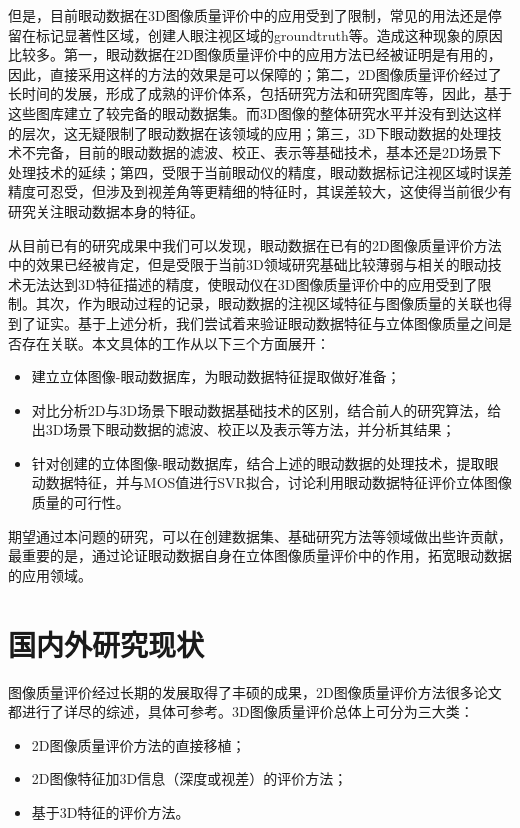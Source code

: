 但是，目前眼动数据在3D图像质量评价中的应用受到了限制，常见的用法还是停留在标记显著性区域，创建人眼注视区域的groundtruth等。造成这种现象的原因比较多。第一，眼动数据在2D图像质量评价中的应用方法已经被证明是有用的\parencite{gidevisual,meining2010eye}，因此，直接采用这样的方法的效果是可以保障的；第二，2D图像质量评价经过了长时间的发展，形成了成熟的评价体系，包括研究方法和研究图库等，因此，基于这些图库建立了较完备的眼动数据集\parencite{winkler2013overview}。而3D图像的整体研究水平并没有到达这样的层次\parencite{bensalma2013perceptual}，这无疑限制了眼动数据在该领域的应用；第三，3D下眼动数据的处理技术不完备，目前的眼动数据的滤波、校正、表示等基础技术，基本还是2D场景下处理技术的延续；第四，受限于当前眼动仪的精度，眼动数据标记注视区域时误差精度可忍受，但涉及到视差角等更精细的特征时，其误差较大，这使得当前很少有研究关注眼动数据本身的特征。

从目前已有的研究成果中我们可以发现，眼动数据在已有的2D图像质量评价方法中的效果已经被肯定，但是受限于当前3D领域研究基础比较薄弱与相关的眼动技术无法达到3D特征描述的精度，使眼动仪在3D图像质量评价中的应用受到了限制。其次，作为眼动过程的记录，眼动数据的注视区域特征与图像质量的关联也得到了证实。基于上述分析，我们尝试着来验证眼动数据特征与立体图像质量之间是否存在关联。本文具体的工作从以下三个方面展开：
\begin{itemize}[noitemsep,topsep=0pt,parsep=0pt,partopsep=0pt]
\item 建立立体图像-眼动数据库，为眼动数据特征提取做好准备；
\item 对比分析2D与3D场景下眼动数据基础技术的区别，结合前人的研究算法，给出3D场景下眼动数据的滤波、校正以及表示等方法，并分析其结果；
\item 针对创建的立体图像-眼动数据库，结合上述的眼动数据的处理技术，提取眼动数据特征，并与MOS值进行SVR拟合，讨论利用眼动数据特征评价立体图像质量的可行性。
\end{itemize}

期望通过本问题的研究，可以在创建数据集、基础研究方法等领域做出些许贡献，最重要的是，通过论证眼动数据自身在立体图像质量评价中的作用，拓宽眼动数据的应用领域。

\section{国内外研究现状}
\label{sec:achievement}
图像质量评价经过长期的发展取得了丰硕的成果，2D图像质量评价方法很多论文都进行了详尽的综述，具体可参考\parencite{wang2006modern,gangyi2010overview}。3D图像质量评价总体上可分为三大类：
\begin{itemize}[noitemsep,topsep=0pt,parsep=0pt,partopsep=0pt]
\item 2D图像质量评价方法的直接移植\parencite{wang2003multiscale,watson1993dctune,miyahara1998objective}；
\item 2D图像特征加3D信息（深度或视差）的评价方法\parencite{you2010perceptual,tikanmaki2008quality}；
\item 基于3D特征的评价方法\parencite{meesters2004survey,cheng20053d}。
\end{itemize}

